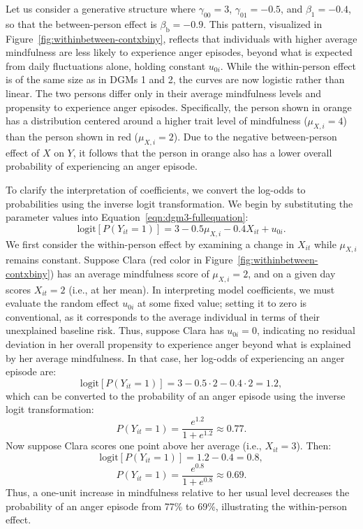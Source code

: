 \documentclass[stu]{apa7}
\begin{document}
Let us consider a generative structure where \( \gamma_{00} = 3 \), \( \gamma_{01} = -0.5 \), and \( \beta_1 = -0.4 \), so that the between-person effect is \( \beta_\text{b} = -0.9 \). This pattern, visualized in Figure~\ref{fig:withinbetween-contxbiny}, reflects that individuals with higher average mindfulness are less likely to experience anger episodes, beyond what is expected from daily fluctuations alone, holding constant $u_{0i}$. While the within-person effect is of the same size as in DGMs 1 and 2, the curves are now logistic rather than linear. The two persons differ only in their average mindfulness levels and propensity to experience anger episodes. Specifically, the person shown in orange has a distribution centered around a higher trait level of mindfulness (\( \mu_{X,i} = 4 \)) than the person shown in red (\( \mu_{X,i} = 2 \)). Due to the negative between-person effect of \( X \) on \( Y \), it follows that the person in orange also has a lower overall probability of experiencing an anger episode.

To clarify the interpretation of coefficients, we convert the log-odds to probabilities using the inverse logit transformation. We begin by substituting the parameter values into Equation~\ref{eqn:dgm3-fullequation}:
$$\text{logit} \left[ P(Y_{it} = 1) \right] = 3  - 0.5 \mu_{X,i} -0.4 X_{it} + u_{0i}.$$
We first consider the within-person effect by examining a change in \( X_{it} \) while \( \mu_{X,i} \) remains constant. Suppose Clara (red color in Figure~\ref{fig:withinbetween-contxbiny}) has an average mindfulness score of \( \mu_{X,i} = 2 \), and on a given day scores \( X_{it} = 2 \) (i.e., at her mean). In interpreting model coefficients, we must evaluate the random effect $u_{0i}$ at some fixed value; setting it to zero is conventional, as it corresponds to the average individual in terms of their unexplained baseline risk. Thus, suppose Clara has $u_{0i} = 0$, indicating no residual deviation in her overall propensity to experience anger beyond what is explained by her average mindfulness. In that case, her log-odds of experiencing an anger episode are:
$$\text{logit} \left[ P(Y_{it} = 1) \right] = 3  - 0.5 \cdot 2 -0.4 \cdot 2 = 1.2,$$
which can be converted to the probability of an anger episode using the inverse logit transformation:
\[
P(Y_{it} = 1) = \frac{e^{1.2}}{1 + e^{1.2}} \approx 0.77.
\]
Now suppose Clara scores one point above her average (i.e., \( X_{it} = 3 \)). Then:
\[
\text{logit} \left[ P(Y_{it} = 1) \right] = 1.2 - 0.4 = 0.8,
\]
\[
P(Y_{it} = 1) = \frac{e^{0.8}}{1 + e^{0.8}} \approx 0.69.
\]
Thus, a one-unit increase in mindfulness relative to her usual level decreases the probability of an anger episode from 77\% to 69\%, illustrating the within-person effect.
\end{document}
